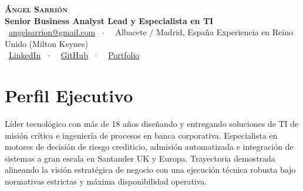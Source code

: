 \documentclass[10pt,a4paper]{article}
\begin{document}
\pagestyle{empty}

\begin{center}
    {\Huge\textbf{\scshape Ángel Sarrión}} \\[4pt]
    {\large\color{SynthBlue}\textbf{Senior Business Analyst Lead y Especialista en TI}} \\[6pt]
    {\small
        \faEnvelope~\href{mailto:angelsarrion@gmail.com}{angelsarrion@gmail.com} \ $\cdot$ \ 
        \faMapMarker*~{Albacete / Madrid, España \textbullet{} Experiencia en Reino Unido (Milton Keynes)} \\[3pt]
        \faLinkedin~\href{https://www.linkedin.com/in/angelsarrion}{LinkedIn} \ $\cdot$ \ 
        \faGithub~\href{https://github.com/angelsarrion}{GitHub} \ $\cdot$ \ 
        \faGlobe~\href{https://angelsarrion.github.io/ASCV/}{Portfolio}
    }
\end{center}

\vspace{-4pt}

\section{Perfil Ejecutivo}
\noindent Líder tecnológico con más de 18 años diseñando y entregando soluciones de TI de misión crítica e ingeniería de procesos en banca corporativa. Especialista en motores de decisión de riesgo crediticio, admisión automatizada e integración de sistemas a gran escala en Santander UK y Europa. Trayectoria demostrada alineando la visión estratégica de negocio con una ejecución técnica robusta bajo normativas estrictas y máxima disponibilidad operativa.

\end{document}

